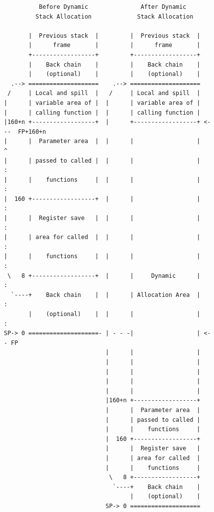 \documentclass[USenglish,fontsize=11pt,twoside,%
  toc=bib,toc=idx,toc=graduated,numbers=noendperiod,
  bookmarks=true,
  bookmarksnumbered=true,
  bookmarksopen=true,
  bookmarksopenlevel=1,
  breaklinks=true,
  colorlinks=true,
  linkcolor=black,
  pdfpagelayout={TwoPageRight},
  pdfusetitle=true
]{scrreprt}
\newif\ifSkipTikZ
\begin{document}
\begin{figure}
  \centering
  \ifSkipTikZ
\begin{verbatim}
          Before Dynamic               After Dynamic
         Stack Allocation             Stack Allocation

       |  Previous stack  |         |  Previous stack  |
       |      frame       |         |      frame       |
       +------------------+         +------------------+
       |    Back chain    |         |    Back chain    |
       |    (optional)    |         |    (optional)    |
  .--> ====================    .--> ====================
 /     | Local and spill  |   /     | Local and spill  |
|      | variable area of |  |      | variable area of |
|      | calling function |  |      | calling function |
|160+n +------------------+  |      +------------------+ <---  FP+160+n
|      |  Parameter area  |  |      |                  |     ^
|      | passed to called |  |      |                  |     :
|      |    functions     |  |      |                  |     :
|  160 +------------------+  |      |                  |     :
|      |  Register save   |  |      |                  |     :
|      | area for called  |  |      |                  |     :
|      |    functions     |  |      |                  |     :
 \   8 +------------------+  |      |     Dynamic      |     :
  `----+    Back chain    |  |      | Allocation Area  |     :
       |    (optional)    |  |      |                  |     :
SP-> 0 ====================- | - - -|                  | <-- FP
                             |      |                  |
                             |      |                  |
                             |      |                  |
                             |      |                  |
                             |      |                  |
                             |160+n +------------------+
                             |      |  Parameter area  |
                             |      | passed to called |
                             |      |    functions     |
                             |  160 +------------------+
                             |      |  Register save   |
                             |      | area for called  |
                             |      |    functions     |
                              \   8 +------------------+
                               `----+    Back chain    |
                                    |    (optional)    |
                             SP-> 0 ====================
\end{verbatim}
  \else

\end{figure}
\end{document}
